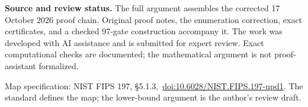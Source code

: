 \documentclass[11pt,letterpaper]{article}
\begin{document}
\textbf{Source and review status.} The full argument assembles the corrected 17 October 2026 proof chain. Original proof notes, the enumeration correction, exact certificates, and a checked 97-gate construction accompany it. The work was developed with AI assistance and is submitted for expert review. Exact computational checks are documented; the mathematical argument is not proof-assistant formalized.\par
\vfill
{\footnotesize\color{muted} Map specification: NIST FIPS 197, \S5.1.3,\
\href{https://doi.org/10.6028/NIST.FIPS.197-upd1}{doi:10.6028/NIST.FIPS.197-upd1}. The standard defines the map; the lower-bound argument is the author's review draft.}
\clearpage
\begingroup
\renewcommand{\contentsname}{Contents}
\small
\tableofcontents
\endgroup
\clearpage


\end{document}
